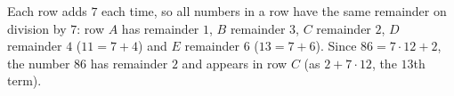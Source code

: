 Each row adds $7$ each time, so all numbers in a row have the same remainder on division by $7$: row $A$ has remainder $1$, $B$ remainder $3$, $C$ remainder $2$, $D$ remainder $4$ ($11=7+4$) and $E$ remainder $6$ ($13=7+6$). Since $86=7\cdot12+2$, the number $86$ has remainder $2$ and appears in row $\boxed{C}$ (as $2+7\cdot12$, the $13$th term).
